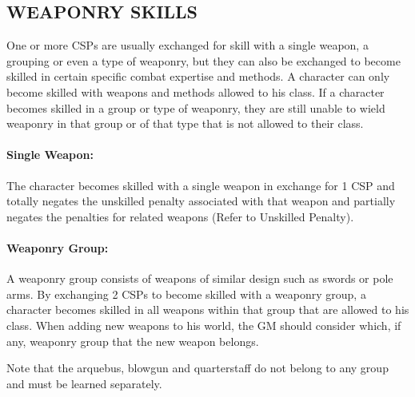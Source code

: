 \begin{multicols}{2}
\section{WEAPONRY SKILLS}

One or more CSPs are usually exchanged for skill with a single weapon, a grouping or even a type of weaponry, but they can also be exchanged to become skilled in certain specific combat expertise and methods.  A character can only become skilled with weapons and methods allowed to his class.  If a character becomes skilled in a group or type of weaponry, they are still unable to wield weaponry in that group or of that type that is not allowed to their class.

\paragraph{Single Weapon:} The character becomes skilled with a single weapon in exchange for 1 CSP and totally negates the unskilled penalty associated with that weapon and partially negates the penalties for related weapons (Refer to Unskilled Penalty). 

\paragraph{Weaponry Group:} A weaponry group consists of weapons of similar design such as swords or pole arms.  By exchanging 2 CSPs to become skilled with a weaponry group, a character becomes skilled in all weapons within that group that are allowed to his class.  When adding new weapons to his world, the GM should consider which, if any, weaponry group that the new weapon belongs.

Note that the arquebus, blowgun and quarterstaff do not belong to any group and must be learned separately.

\noindent
\begin{minipage}{\columnwidth}


\end{minipage}
\end{multicols}
